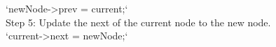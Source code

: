 \documentclass[preview]{standalone}
\begin{document}
`newNode->prev = current;`\\Step 5: Update the next of the current node to the new node.\\`current->next = newNode;`\\
\end{document}
